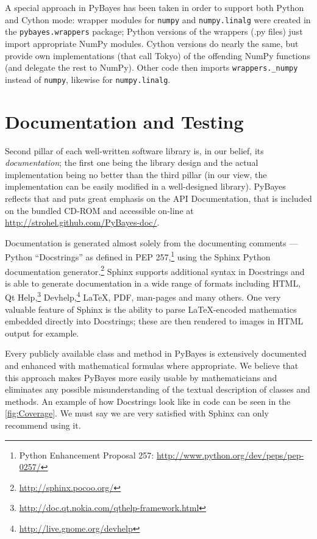 A special approach in PyBayes has been taken in order to support both Python and
Cython mode: wrapper modules for \verb|numpy| and \verb|numpy.linalg| were created in the
\verb|pybayes.wrappers| package; Python versions of the wrappers (.py files) just import appropriate
NumPy modules. Cython versions do nearly the same, but provide own implementations (that call Tokyo)
of the offending NumPy functions (and delegate the rest to NumPy). Other code then imports
\verb|wrappers._numpy| instead of \verb|numpy|, likewise for \verb|numpy.linalg|.

\section{Documentation and Testing} \label{sec:PyBayesDocsTests}

Second pillar of each well-written software library is, in our belief, its \emph{documentation}; the
first one being the library design and the actual implementation being no better than the third
pillar (in our view, the implementation can be easily modified in a well-designed library). PyBayes
reflects that and puts great emphasis on the API Documentation, that is
\ifattachements included on the bundled CD-ROM and \fi
accessible on-line at \url{http://strohel.github.com/PyBayes-doc/}.

Documentation is generated almost solely from the documenting comments --- Python ``Docstrings'' as
defined in PEP 257,\footnote{Python Enhancement Proposal 257: \url{http://www.python.org/dev/peps/pep-0257/}}
using the Sphinx Python documentation generator.\footnote{\url{http://sphinx.pocoo.org/}} Sphinx
supports additional syntax in Docstrings and is able to generate documentation in a wide range of
formats including HTML, Qt Help,\footnote{\url{http://doc.qt.nokia.com/qthelp-framework.html}}
Devhelp,\footnote{\url{http://live.gnome.org/devhelp}} \LaTeX, PDF, man-pages and many others. One
very valuable feature of Sphinx is the ability to parse {\LaTeX}-encoded mathematics embedded
directly into Docstrings; these are then rendered to images in HTML output for example.

Every publicly available class and method in PyBayes is extensively documented and enhanced with
mathematical formulas where appropriate. We believe that this approach makes
PyBayes more easily usable by mathematicians and eliminates any possible misunderstanding of the textual
description of classes and methods. An example of how Docstrings look like in code can be seen in
the \autoref{fig:Coverage}. We must say we are very satisfied with Sphinx can only recommend using
it.

